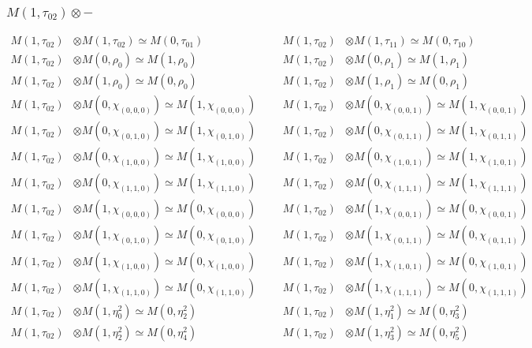\subsubsection{$ M(1,\tau_{02})\otimes -$}
\begin{align*}
M(1,\tau_{02}) &\otimes M(1,\tau_{02}) \simeq M(0,\tau_{01}) &&& M(1,\tau_{02}) &\otimes M(1,\tau_{11}) \simeq M(0,\tau_{10})\\
M(1,\tau_{02}) &\otimes M(0,\rho_{0}) \simeq M(1,\rho_{0}) &&& M(1,\tau_{02}) &\otimes M(0,\rho_{1}) \simeq M(1,\rho_{1})\\
M(1,\tau_{02}) &\otimes M(1,\rho_{0}) \simeq M(0,\rho_{0}) &&& M(1,\tau_{02}) &\otimes M(1,\rho_{1}) \simeq M(0,\rho_{1})\\
M(1,\tau_{02}) &\otimes M(0,\chi_{(0,0,0)}) \simeq M(1,\chi_{(0,0,0)}) &&& M(1,\tau_{02}) &\otimes M(0,\chi_{(0,0,1)}) \simeq M(1,\chi_{(0,0,1)})\\
M(1,\tau_{02}) &\otimes M(0,\chi_{(0,1,0)}) \simeq M(1,\chi_{(0,1,0)}) &&& M(1,\tau_{02}) &\otimes M(0,\chi_{(0,1,1)}) \simeq M(1,\chi_{(0,1,1)})\\
M(1,\tau_{02}) &\otimes M(0,\chi_{(1,0,0)}) \simeq M(1,\chi_{(1,0,0)}) &&& M(1,\tau_{02}) &\otimes M(0,\chi_{(1,0,1)}) \simeq M(1,\chi_{(1,0,1)})\\
M(1,\tau_{02}) &\otimes M(0,\chi_{(1,1,0)}) \simeq M(1,\chi_{(1,1,0)}) &&& M(1,\tau_{02}) &\otimes M(0,\chi_{(1,1,1)}) \simeq M(1,\chi_{(1,1,1)})\\
M(1,\tau_{02}) &\otimes M(1,\chi_{(0,0,0)}) \simeq M(0,\chi_{(0,0,0)}) &&& M(1,\tau_{02}) &\otimes M(1,\chi_{(0,0,1)}) \simeq M(0,\chi_{(0,0,1)})\\
M(1,\tau_{02}) &\otimes M(1,\chi_{(0,1,0)}) \simeq M(0,\chi_{(0,1,0)}) &&& M(1,\tau_{02}) &\otimes M(1,\chi_{(0,1,1)}) \simeq M(0,\chi_{(0,1,1)})\\
M(1,\tau_{02}) &\otimes M(1,\chi_{(1,0,0)}) \simeq M(0,\chi_{(1,0,0)}) &&& M(1,\tau_{02}) &\otimes M(1,\chi_{(1,0,1)}) \simeq M(0,\chi_{(1,0,1)})\\
M(1,\tau_{02}) &\otimes M(1,\chi_{(1,1,0)}) \simeq M(0,\chi_{(1,1,0)}) &&& M(1,\tau_{02}) &\otimes M(1,\chi_{(1,1,1)}) \simeq M(0,\chi_{(1,1,1)})\\
M(1,\tau_{02}) &\otimes M(1,\eta^{2}_{0}) \simeq M(0,\eta^{2}_{2}) &&& M(1,\tau_{02}) &\otimes M(1,\eta^{2}_{1}) \simeq M(0,\eta^{2}_{3})\\
M(1,\tau_{02}) &\otimes M(1,\eta^{2}_{2}) \simeq M(0,\eta^{2}_{4}) &&& M(1,\tau_{02}) &\otimes M(1,\eta^{2}_{3}) \simeq M(0,\eta^{2}_{5})\\

\end{align*}
